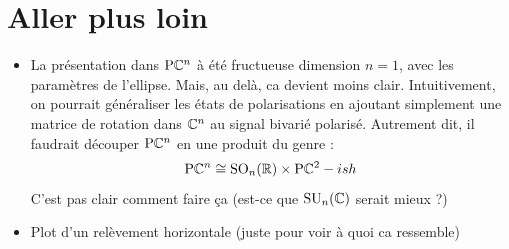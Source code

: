 \section{Aller plus loin}

\begin{itemize}
	
	\item La présentation dans $\text{\normalfont P}\mathbb{C}^{n}$ à été fructueuse dimension $n=1$, avec les paramètres de l'ellipse. Mais, au delà, ca devient moins clair. Intuitivement, on pourrait généraliser les états de polarisations en ajoutant simplement une matrice de rotation dans $\mathbb{C}^n$ au signal bivarié polarisé. Autrement dit, il faudrait découper $\text{\normalfont P}\mathbb{C}^{n}$ en une produit du genre :
	\[\text{\normalfont P}\mathbb{C}^{n} \cong \text{\normalfont SO}_n(\mathbb{R})\times \text{\normalfont P}\mathbb{C}^{2}-ish\]
	C'est pas clair comment faire ça (est-ce que $\text{\normalfont SU}_n(\mathbb{C})$ serait mieux ?)
	
	\item Plot d'un relèvement horizontale (juste pour voir à quoi ca ressemble)
\end{itemize}







